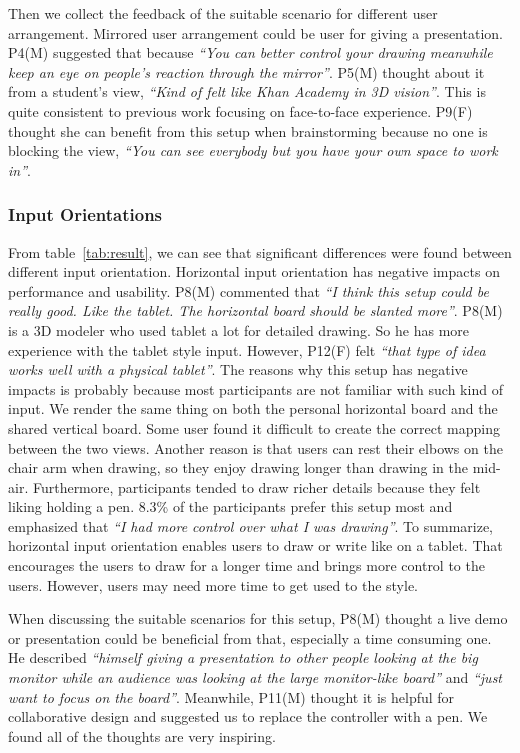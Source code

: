 \documentclass{sigchi}
\begin{document}
Then we collect the feedback of the suitable scenario for different user arrangement. Mirrored user arrangement could be user for giving a presentation. P4(M) suggested that because \textit{``You can better control your drawing meanwhile keep an eye on people's reaction through the mirror''}. P5(M) thought about it from a student's view, \textit{``Kind of felt like Khan Academy in 3D vision''}. This is quite consistent to previous work focusing on face-to-face experience. P9(F) thought she can benefit from this setup when brainstorming because no one is blocking the view, \textit{``You can see everybody but you have your own space to work in''}.

\subsubsection{Input Orientations}
From table~\ref{tab:result}, we can see that significant differences were found between different input orientation. Horizontal input orientation has negative impacts on performance and usability. P8(M) commented that \textit{``I think this setup could be really good. Like the tablet. The horizontal board should be slanted more''}. P8(M) is a 3D modeler who used tablet a lot for detailed drawing. So he has more experience with the tablet style input. However, P12(F) felt \textit{``that type of idea works well with a physical tablet''}. The reasons why this setup has negative impacts is probably because most participants are not familiar with such kind of input. We render the same thing on both the personal horizontal board and the shared vertical board. Some user found it difficult to create the correct mapping between the two views. Another reason is that users can rest their elbows on the chair arm when drawing, so they enjoy drawing longer than drawing in the mid-air. Furthermore, participants tended to draw richer details because they felt liking holding a pen. 8.3\% of the participants prefer this setup most and emphasized that \textit{``I had more control over what I was drawing''}. To summarize, horizontal input orientation enables users to draw or write like on a tablet. That encourages the users to draw for a longer time and brings more control to the users. However, users may need more time to get used to the style.

When discussing the suitable scenarios for this setup, P8(M) thought a live demo or presentation could be beneficial from that, especially a time consuming one. He described \textit{``himself giving a presentation to other people looking at the big monitor while an audience was looking at the large monitor-like board''} and \textit{``just want to focus on the board''}. Meanwhile, P11(M) thought it is helpful for collaborative design and suggested us to replace the controller with a pen. We found all of the thoughts are very inspiring.
\end{document}

